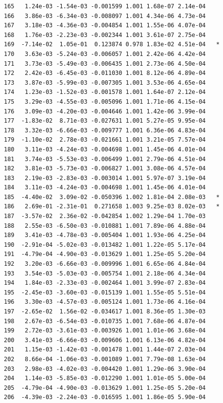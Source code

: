 \documentclass[
  letterpaper,
  DIV=11,
  numbers=noendperiod]{scrartcl}
\begin{document}
\begin{verbatim}
165   1.24e-03 -1.54e-03 -0.001599 1.001 1.68e-07 2.14e-04    
166   3.86e-03 -6.34e-03 -0.008097 1.001 4.34e-06 4.73e-04    
167   3.18e-03 -4.36e-03 -0.004854 1.001 1.55e-06 4.07e-04    
168   1.76e-03 -2.23e-03 -0.002344 1.001 3.61e-07 2.75e-04    
169  -7.14e-02  1.05e-01  0.123874 0.978 1.83e-02 4.51e-04   *
170   3.63e-03 -5.24e-03 -0.006057 1.001 2.42e-06 4.42e-04    
171   3.73e-03 -5.49e-03 -0.006435 1.001 2.73e-06 4.50e-04    
172   2.42e-03 -6.45e-03 -0.011030 1.001 8.12e-06 4.89e-04    
173   3.87e-03 -5.99e-03 -0.007305 1.001 3.53e-06 4.65e-04    
174   1.23e-03 -1.52e-03 -0.001578 1.001 1.64e-07 2.12e-04    
175   3.29e-03 -4.55e-03 -0.005096 1.001 1.71e-06 4.15e-04    
176   3.09e-03 -4.20e-03 -0.004646 1.001 1.42e-06 3.99e-04    
177  -1.83e-02  8.71e-03 -0.027631 1.001 5.27e-05 9.95e-04    
178   3.32e-03 -6.66e-03 -0.009777 1.001 6.36e-06 4.83e-04    
179  -1.10e-02  2.78e-03 -0.021661 1.001 3.21e-05 7.57e-04    
180   3.11e-03 -4.24e-03 -0.004698 1.001 1.45e-06 4.01e-04    
181   3.74e-03 -5.53e-03 -0.006499 1.001 2.79e-06 4.51e-04    
182   3.81e-03 -5.73e-03 -0.006827 1.001 3.08e-06 4.57e-04    
183   2.19e-03 -2.83e-03 -0.003014 1.001 5.97e-07 3.19e-04    
184   3.11e-03 -4.24e-03 -0.004698 1.001 1.45e-06 4.01e-04    
185  -4.40e-02  3.09e-02 -0.050396 1.002 1.81e-04 2.08e-03   *
186   2.69e-01 -2.31e-01  0.271658 1.003 9.25e-03 8.02e-03   *
187  -3.57e-02  2.36e-02 -0.042854 1.002 1.29e-04 1.70e-03    
188   2.55e-03 -6.50e-03 -0.010881 1.001 7.89e-06 4.88e-04    
189   3.41e-03 -4.78e-03 -0.005404 1.001 1.93e-06 4.25e-04    
190  -2.91e-04 -5.02e-03 -0.013482 1.001 1.22e-05 5.17e-04    
191  -4.79e-04 -4.90e-03 -0.013629 1.001 1.25e-05 5.20e-04    
192   3.20e-03 -6.66e-03 -0.009996 1.001 6.65e-06 4.84e-04    
193   3.54e-03 -5.03e-03 -0.005754 1.001 2.18e-06 4.34e-04    
194   1.84e-03 -2.33e-03 -0.002464 1.001 3.99e-07 2.83e-04    
195  -2.45e-03 -3.60e-03 -0.015139 1.001 1.55e-05 5.51e-04    
196   3.30e-03 -4.57e-03 -0.005124 1.001 1.73e-06 4.16e-04    
197  -2.65e-02  1.56e-02 -0.034617 1.001 8.36e-05 1.30e-03    
198   2.67e-03 -6.54e-03 -0.010735 1.001 7.68e-06 4.87e-04    
199   2.72e-03 -3.61e-03 -0.003926 1.001 1.01e-06 3.68e-04    
200   3.41e-03 -6.66e-03 -0.009606 1.001 6.13e-06 4.82e-04    
201   1.15e-03 -1.42e-03 -0.001478 1.001 1.44e-07 2.03e-04    
202   8.66e-04 -1.06e-03 -0.001089 1.001 7.79e-08 1.63e-04    
203   2.98e-03 -4.02e-03 -0.004420 1.001 1.29e-06 3.90e-04    
204   1.14e-03 -5.85e-03 -0.012290 1.001 1.01e-05 5.00e-04    
205  -4.79e-04 -4.90e-03 -0.013629 1.001 1.25e-05 5.20e-04    
206  -4.39e-03 -2.24e-03 -0.016595 1.001 1.86e-05 5.90e-04    

\end{verbatim}
\end{document}
